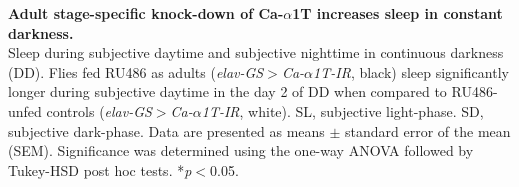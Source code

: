 \label{fig:S5}
\textbf{Adult stage-specific knock-down of Ca-$\alpha$1T increases sleep in constant darkness.}
\\
Sleep during subjective daytime and subjective nighttime in continuous darkness (DD). 
Flies fed RU486 as adults (\emph{elav-GS$>$Ca-$\alpha$1T-IR}, black) sleep significantly longer during subjective daytime in the day 2 of DD when compared to RU486-unfed controls (\emph{elav-GS$>$Ca-$\alpha$1T-IR}, white).
SL, subjective light-phase.
SD, subjective dark-phase.
Data are presented as means $\pm$ standard error of the mean (SEM).
Significance was determined using the one-way ANOVA followed by Tukey-HSD post hoc tests.
*\emph{p}$<$0.05.
